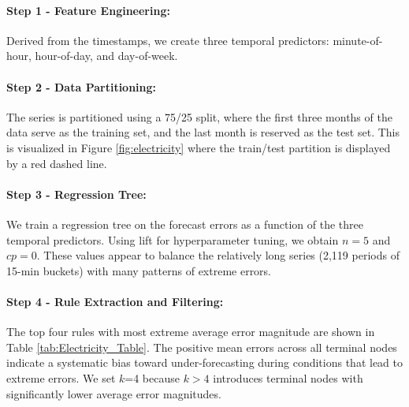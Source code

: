 \documentclass[12pt]{article}
\begin{document}
\paragraph{Step 1 - Feature Engineering:}
Derived from the timestamps, we create three temporal predictors: minute-of-hour, hour-of-day, and day-of-week.

\paragraph{Step 2 - Data Partitioning:} The series is partitioned using a 75/25 split, where the first three months of the data serve as the training set, and the last month is reserved as the test set. This is visualized in Figure \ref{fig:electricity} where the train/test partition is displayed by a red dashed line.

\paragraph{Step 3 - Regression Tree:} We train a regression tree on the forecast errors as a function of the three temporal predictors. Using lift for hyperparameter tuning, we obtain $n = 5$ and $cp = 0$. These values appear to balance the relatively long series %
(2,119 periods of 15-min buckets) with many patterns of extreme errors. %

\paragraph{Step 4 - Rule Extraction and Filtering:}
\label{sec:rule_filtering}
The top four rules with most extreme average error magnitude are shown in Table \ref{tab:Electricity_Table}. 
The positive mean errors across all terminal nodes indicate a systematic bias toward under-forecasting during conditions that lead to extreme errors. We set $k$=4 because $k>4$ introduces terminal nodes with significantly lower 
average error magnitudes. %

\end{document}
